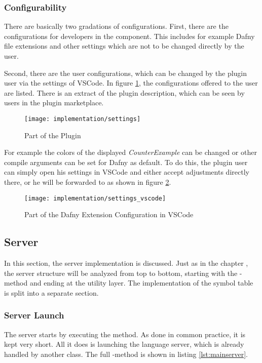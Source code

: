 \subsubsection{Configurability}
There are basically two gradations of configurations.
First, there are the configurations for developers in the  component.
This includes for example Dafny file extensions and other settings which are not to be changed directly by the user.

Second, there are the user configurations, which can be changed by the plugin user via the settings of VSCode.
In figure \ref{fig:settings}, the configurations offered to the user are listed.
There is an extract of the plugin description, which can be seen by users in the plugin marketplace.

\begin{figure}[H]
    \centering
    \texttt{[image: implementation/settings]}
    \caption{Part of the Plugin }
    \label{fig:settings}
\end{figure}

For example the colors of the displayed \textit{CounterExample} can be changed or other compile arguments can be set for Dafny as default.
To do this, the plugin user can simply open his settings in VSCode and
either accept adjustments directly there, or he will be forwarded to  as shown in figure \ref{fig:settings_vscode}.

\begin{figure}[H]
    \centering
    \texttt{[image: implementation/settings\_vscode]}
    \caption{Part of the Dafny Extension Configuration in VSCode}
    \label{fig:settings_vscode}
\end{figure}

\subsection{Server}
In this section, the server implementation is discussed.
Just as in the chapter , the server structure will be analyzed from top to bottom, starting with the -method and ending at the utility layer.
The implementation of the symbol table is split into a separate section.

\subsubsection{Server Launch}
The server starts by executing the  method.
As done in common practice, it is kept very short.
All it does is launching the language server, which is already handled by another class.
The full -method is shown in listing \ref{lst:mainserver}.

